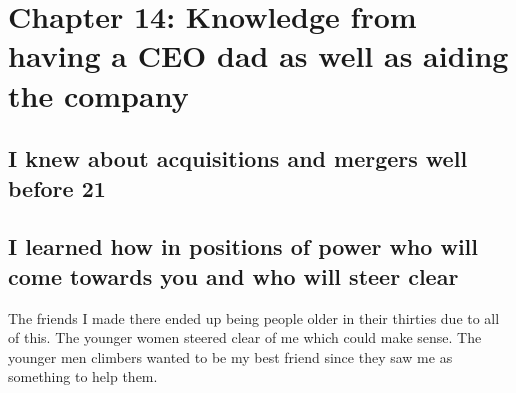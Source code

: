 \chapter{Chapter 14: Knowledge from having a CEO dad as well as aiding the company}
\section{I knew about acquisitions and mergers well before 21}
\section{I learned how in positions of power who will come towards you and who will steer clear}
The friends I made there ended up being people older in their thirties due to all of this. The younger women steered clear of me which could make sense. The younger men climbers wanted to be my best friend since they saw me as something to help them. 